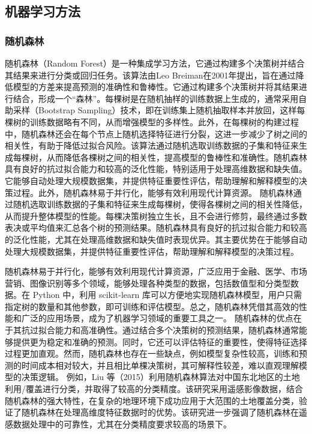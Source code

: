 \documentclass{article}
\begin{document}
	\subsection{机器学习方法}
	
	\subsubsection{随机森林}
	随机森林（Random Forest）是一种集成学习方法，它通过构建多个决策树并结合其结果来进行分类或回归任务。该算法由Leo Breiman在2001年提出，旨在通过降低模型的方差来提高预测的准确性和鲁棒性。它通过构建多个决策树并将其结果进行结合，形成一个“森林”。每棵树是在随机抽样的训练数据上生成的，通常采用自助采样（Bootstrap Sampling）技术，即在训练集上随机抽取样本并放回，这样每棵树的训练数据略有不同，从而增强模型的多样性。此外，在每棵树的构建过程中，随机森林还会在每个节点上随机选择特征进行分裂，这进一步减少了树之间的相关性，有助于降低过拟合风险。该算法通过随机选取训练数据的子集和特征来生成每棵树，从而降低各棵树之间的相关性，提高模型的鲁棒性和准确性。随机森林具有良好的抗过拟合能力和较高的泛化性能，特别适用于处理高维数据和缺失值。它能够自动处理大规模数据集，并提供特征重要性评估，帮助理解和解释模型的决策过程。此外，随机森林易于并行化，能够有效利用现代计算资源。
	随机森林通过随机选取训练数据的子集和特征来生成每棵树，使得各棵树之间的相关性降低，从而提升整体模型的性能。每棵决策树独立生长，且不会进行修剪，最终通过多数表决或平均值来汇总各个树的预测结果。随机森林具有良好的抗过拟合能力和较高的泛化性能，尤其在处理高维数据和缺失值时表现优异。其主要优势在于能够自动处理大规模数据集，并提供特征重要性评估，帮助理解和解释模型的决策过程。

	
	随机森林易于并行化，能够有效利用现代计算资源，广泛应用于金融、医学、市场营销、图像识别等多个领域，能够处理各种类型的数据，包括数值型和分类型数据。在 Python 中，利用 scikit-learn 库可以方便地实现随机森林模型，用户只需指定树的数量和其他参数，即可训练和评估模型。总之，随机森林凭借其高效的性能和广泛的应用场景，成为了机器学习领域的重要工具之一。
	随机森林的优点在于其抗过拟合能力和高准确性。通过结合多个决策树的预测结果，随机森林通常能够提供更为稳定和准确的预测。同时，它还可以评估特征的重要性，使得特征选择过程更加直观。然而，随机森林也存在一些缺点，例如模型复杂性较高，训练和预测的时间成本相对较大，并且相比单棵决策树，其可解释性较差，难以直观理解模型的决策逻辑。
	例如，Liu 等（2015）利用随机森林算法对中国东北地区的土地利用/覆盖进行分类，并取得了较高的分类精度。该研究采用遥感影像数据，结合随机森林的强大特性，在复杂的地理环境下成功应用于大范围的土地覆盖分类，验证了随机森林在处理高维度特征数据时的优势\cite{liu2015}。该研究进一步强调了随机森林在遥感数据处理中的可靠性，尤其在分类精度要求较高的场景下。
	
\end{document}
